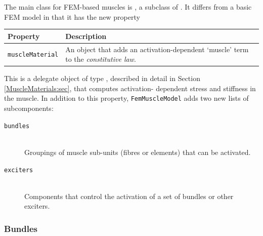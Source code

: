 The main class for FEM-based muscles is 
, a subclass 
of .  It differs from a basic
FEM model in that it has the new property
\begin{center}
	\begin{tabular}{|ll|}
		\hline
		Property & Description\\
		\hline
		{\tt muscleMaterial} & An object that adds an activation-dependent
		                       `muscle' term to the \emph{constitutive law}.\\
		\hline
	\end{tabular}
\end{center}
This is a delegate object of type 
, described
in detail in Section \ref{MuscleMaterials:sec}, that computes activation-%
dependent stress and stiffness in the muscle. 
In addition to this property, 
{\tt FemMuscleModel} adds two new lists of subcomponents:
\begin{description}
   \item[{\tt bundles}]\mbox{}\\
   Groupings of muscle sub-units (fibres or elements) that can be activated.

   \item[{\tt exciters}]\mbox{}\\
   Components that control the activation of a set of bundles or other exciters.
\end{description}

\subsubsection{Bundles}
\label{MuscleBundles:sec}
\ifLaTeXML{\newline}

